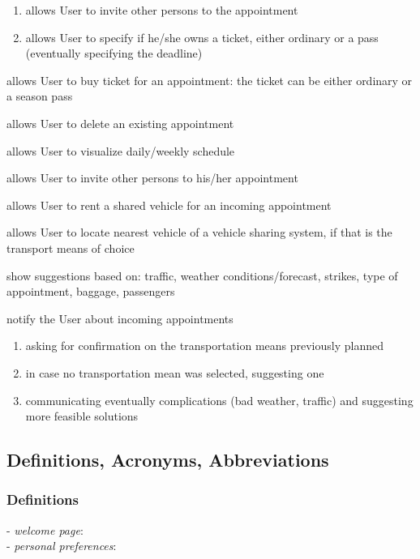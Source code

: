 \begin{enumerate}[label={[G\arabic*]}]
\begin{enumerate}[label=\theenumi\#{\arabic*}]
			\item allows User to invite other persons to the appointment
			\item allows User to specify if he/she owns a ticket, either ordinary or a pass (eventually specifying the deadline)
		\end{enumerate}
		\item allows User to buy ticket for an appointment: the ticket can be either ordinary or a season pass
		\item allows User to delete an existing appointment
		\item allows User to visualize daily/weekly schedule
		\item allows User to invite other persons to his/her appointment
		\item allows User to rent a shared vehicle for an incoming appointment
		\item allows User to locate nearest vehicle of a vehicle sharing system, if that is the transport means of choice

		\item show suggestions based on: traffic, weather conditions/forecast, strikes, type of appointment, baggage, passengers
		\item notify the User about incoming appointments
		\begin{enumerate}[label=\theenumi\#{\arabic*}]
			\item asking for confirmation on the transportation means previously planned
			\item in case no transportation mean was selected, suggesting one
			\item communicating eventually complications (bad weather, traffic) and suggesting more feasible solutions
		\end{enumerate}
	\end{enumerate}

\subsection{Definitions, Acronyms, Abbreviations}
	\subsubsection{Definitions}
		\begin{description}
			\item[- \textit{welcome page}:] %
			\item[- \textit{personal preferences}:] %
		\end{description}
